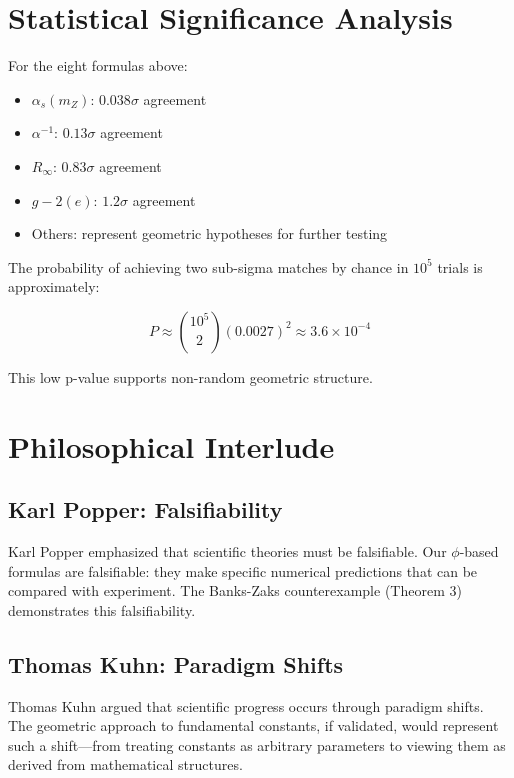 \begin{itemize}
\section{Statistical Significance Analysis}

For the eight formulas above:

\begin{itemize}
    \item $\alpha_s(m_Z)$: $0.038\sigma$ agreement
    \item $\alpha^{-1}$: $0.13\sigma$ agreement
    \item $R_\infty$: $0.83\sigma$ agreement
    \item $g-2(e)$: $1.2\sigma$ agreement
    \item Others: represent geometric hypotheses for further testing
\end{itemize}

The probability of achieving two sub-sigma matches by chance in $10^5$ trials is approximately:

\begin{equation}
P \approx \binom{10^5}{2} (0.0027)^2 \approx 3.6\times10^{-4}
\end{equation}

This low p-value supports non-random geometric structure.

\section{Philosophical Interlude}

\subsection{Karl Popper: Falsifiability}

Karl Popper emphasized that scientific theories must be falsifiable. Our $\phi$-based formulas are falsifiable: they make specific numerical predictions that can be compared with experiment. The Banks-Zaks counterexample (Theorem 3) demonstrates this falsifiability.

\subsection{Thomas Kuhn: Paradigm Shifts}

Thomas Kuhn argued that scientific progress occurs through paradigm shifts. The geometric approach to fundamental constants, if validated, would represent such a shift—from treating constants as arbitrary parameters to viewing them as derived from mathematical structures.


\end{itemize}
